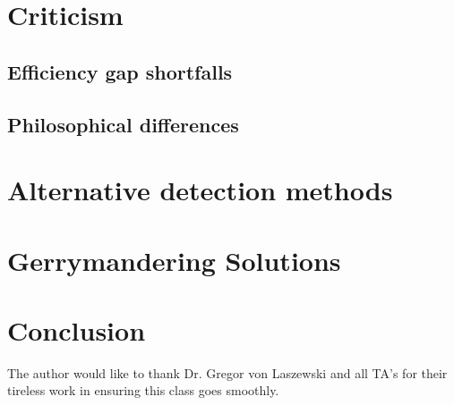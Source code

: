\documentclass[sigconf]{acmart}
\begin{document}
\section{Criticism}
\subsection{Efficiency gap shortfalls}
\subsection{Philosophical differences}

\section{Alternative detection methods}

\section{Gerrymandering Solutions}

\section{Conclusion}


\begin{acks}

  The author would like to thank Dr. Gregor von Laszewski and all TA's for their tireless work in ensuring this class goes smoothly.

\end{acks}


 

\appendix


\end{document}
